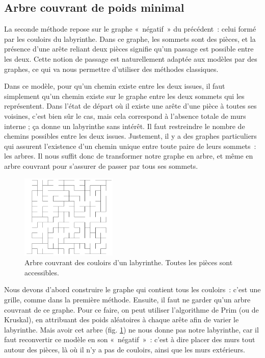 \documentclass[a4paper, 10pt]{article}
\begin{document}
\subsection*{Arbre couvrant de poids minimal}

La seconde méthode repose sur le graphe «~négatif~» du précédent~:
celui formé par les couloirs du labyrinthe. Dans ce graphe, les
sommets sont des pièces, et la présence d'une arête reliant deux
pièces signifie qu'un passage est possible entre les deux. Cette
notion de passage est naturellement adaptée aux modèles par des
graphes, ce qui va nous permettre d'utiliser des méthodes classiques.

Dans ce modèle, pour qu'un chemin existe entre les deux issues, il
faut simplement qu'un chemin existe sur le graphe entre les deux
sommets qui les représentent. Dans l'état de départ où il existe une
arête d'une pièce à toutes ses voisines, c'est bien sûr le cas, mais
cela correspond à l'absence totale de murs interne ; ça donne un
labyrinthe sans intérêt. Il faut restreindre le nombre de chemins
possibles entre les deux issues. Justement, il y a des graphes
particuliers qui assurent l'existence d'un chemin unique entre toute
paire de leurs sommets~: les arbres. Il nous suffit donc de
transformer notre graphe en arbre, et même en arbre couvrant pour
s'assurer de passer par tous ses sommets.

\begin{figure}[hbt]
  \centering
  \includegraphics[height=4cm]{laby-tree.png}
  \caption{Arbre couvrant des couloirs d'un labyrinthe. Toutes les
    pièces sont accessibles.}
  \label{fig:laby-tree}
\end{figure}

Nous devons d'abord construire le graphe qui contient tous les
couloirs~: c'est une grille, comme dans la première méthode. Ensuite,
il faut ne garder qu'un arbre couvrant de ce graphe. Pour ce faire, on
peut utiliser l'algorithme de Prim (ou de Kruskal), en attribuant des
poids aléatoires à chaque arête afin de varier le labyrinthe. Mais
avoir cet arbre (fig. \ref{fig:laby-tree}) ne nous donne pas notre
labyrinthe, car il faut reconvertir ce modèle en son «~négatif~»~:
c'est à dire placer des murs tout autour des pièces, là où il n'y a
pas de couloirs, ainsi que les murs extérieurs.
\end{document}

